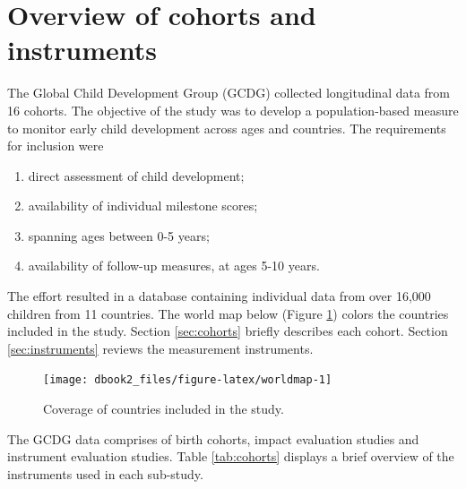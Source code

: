 \documentclass[
]{book}
\providecommand{\tightlist}{%
  \setlength{\itemsep}{0pt}\setlength{\parskip}{0pt}}
\begin{document}
\hypertarget{sec:gcdgoverview}{%
\section{Overview of cohorts and instruments}\label{sec:gcdgoverview}}

The Global Child Development Group (GCDG) collected longitudinal data from 16 cohorts. The objective of the study was to develop a population-based measure to monitor early child development across ages and countries. The requirements for inclusion were

\begin{enumerate}
\def\labelenumi{\arabic{enumi}.}
\tightlist
\item
  direct assessment of child development;
\item
  availability of individual milestone scores;
\item
  spanning ages between 0-5 years;
\item
  availability of follow-up measures, at ages 5-10 years.
\end{enumerate}

The effort resulted in a database containing individual data from over 16,000 children from 11 countries. The world map below (Figure \ref{fig:worldmap}) colors the countries included in the study. Section \ref{sec:cohorts} briefly describes each cohort. Section \ref{sec:instruments} reviews the measurement instruments.

\begin{figure}

{\centering \texttt{[image: dbook2\_files/figure-latex/worldmap-1]} 

}

\caption{Coverage of countries included in the study.}\label{fig:worldmap}
\end{figure}



The GCDG data comprises of birth cohorts, impact evaluation studies and instrument evaluation studies. Table \ref{tab:cohorts} displays a brief overview of the instruments used in each sub-study.
\end{document}
